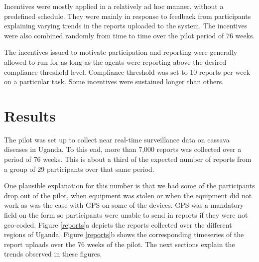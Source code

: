 \documentclass[letterpaper]{article} %
\begin{document}
Incentives were mostly applied in a relatively ad hoc manner, without a predefined schedule. They were mainly in response to feedback from participants explaining varying trends in the reports uploaded to the system. The incentives were also combined randomly from time to time over the pilot period of 76 weeks. 

The incentives issued to motivate participation and reporting were generally allowed to run for as long as the agents were reporting above the desired compliance threshold level. Compliance threshold was set to 10 reports per week on a particular task. Some incentives were sustained longer than others.


 




\section{Results}
The pilot was set up to collect near real-time surveillance data on cassava diseases in Uganda. To this end, more than 7,000 reports was collected over a period of 76 weeks. This is about a third of the expected number of reports from a group of 29 participants over that same period. 

One plausible explanation for this number is that we had some of the participants drop out of the pilot, when equipment was stolen or when the equipment did not work as was the case with GPS on some of the devices. GPS was a mandatory field on the form so participants were unable to send in reports if they were not geo-coded. Figure \ref{reports}a depicts the reports collected over the different regions of Uganda. Figure \ref{reports}b shows the corresponding timeseries of the report uploads over the 76 weeks of the pilot. The next sections explain the trends observed in these figures.
\end{document}

